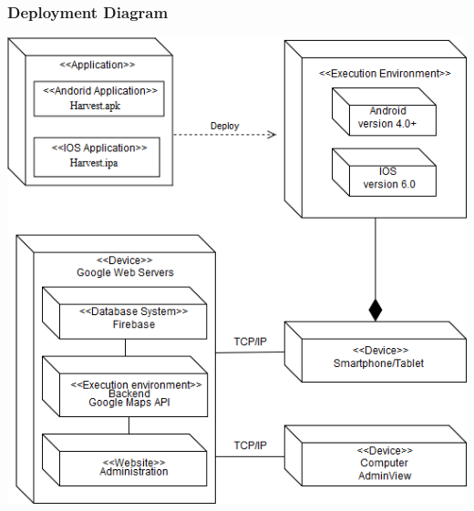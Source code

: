 \documentclass[11pt]{article}
\begin{document}
\subsubsection{Deployment Diagram}
\includegraphics[width=.85\linewidth]{deployment.png}
\end{document}
